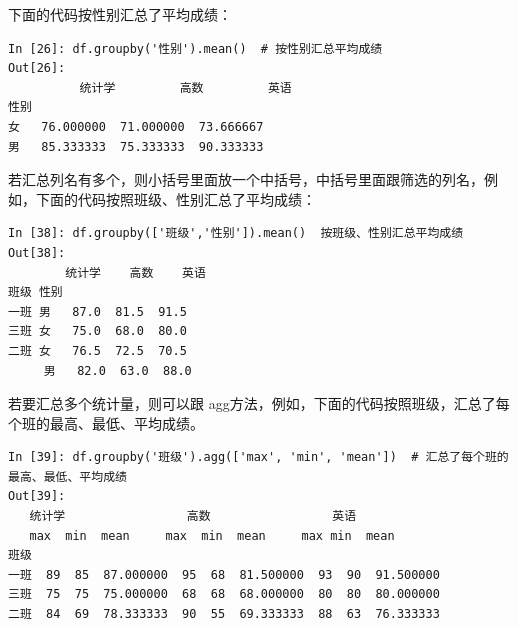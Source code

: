 下面的代码按性别汇总了平均成绩：

\begin{lstlisting}[Language=Python]
In [26]: df.groupby('性别').mean()  # 按性别汇总平均成绩
Out[26]:
          统计学         高数         英语
性别
女   76.000000  71.000000  73.666667
男   85.333333  75.333333  90.333333
\end{lstlisting}

若汇总列名有多个，则小括号里面放一个中括号，中括号里面跟筛选的列名，例如，下面的代码按照班级、性别汇总了平均成绩：

\begin{lstlisting}[Language=Python]
In [38]: df.groupby(['班级','性别']).mean()  按班级、性别汇总平均成绩
Out[38]:
        统计学    高数    英语
班级 性别
一班 男   87.0  81.5  91.5
三班 女   75.0  68.0  80.0
二班 女   76.5  72.5  70.5
     男   82.0  63.0  88.0
\end{lstlisting}

若要汇总多个统计量，则可以跟 agg方法，例如，下面的代码按照班级，汇总了每个班的最高、最低、平均成绩。

\begin{lstlisting}[Language=Python]
In [39]: df.groupby('班级').agg(['max', 'min', 'mean'])  # 汇总了每个班的最高、最低、平均成绩
Out[39]:
   统计学                 高数                 英语
   max  min  mean     max  min  mean     max min  mean
班级
一班  89  85  87.000000  95  68  81.500000  93  90  91.500000
三班  75  75  75.000000  68  68  68.000000  80  80  80.000000
二班  84  69  78.333333  90  55  69.333333  88  63  76.333333
\end{lstlisting}

